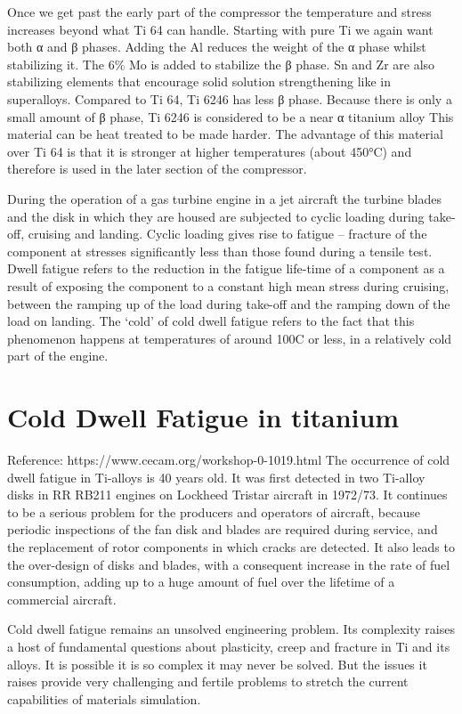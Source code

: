 Once we get past the early part of the compressor the temperature and stress increases beyond what Ti 64 can handle.  Starting with pure Ti we again want both α and β phases.  Adding the Al reduces the weight of the α phase whilst stabilizing it.  The 6\% Mo is added to stabilize the β phase.  Sn and Zr are also stabilizing elements that encourage solid solution strengthening like in superalloys.  Compared to Ti 64, Ti 6246 has less β phase.  Because there is only a small amount of β phase, Ti 6246 is considered to be a near α titanium alloy  This material can be heat treated to be made harder.  The advantage of this material over Ti 64 is that it is stronger at higher temperatures (about 450°C) and therefore is used in the later section of the compressor.

During the operation of a gas turbine engine in a jet aircraft the turbine blades and the disk in which they are housed are subjected to cyclic loading during take-off, cruising and landing. Cyclic loading gives rise to fatigue – fracture of the component at stresses significantly less than those found during a tensile test. Dwell fatigue refers to the reduction in the fatigue life-time of a component as a result of exposing the component to a constant high mean stress during cruising, between the ramping up of the load during take-off and the ramping down of the load on landing. The ‘cold’ of cold dwell fatigue refers to the fact that this phenomenon happens at temperatures of around 100C or less, in a relatively cold part of the engine.



\section{Cold Dwell Fatigue in titanium} 
Reference: https://www.cecam.org/workshop-0-1019.html
The occurrence of cold dwell fatigue in Ti-alloys is 40 years old. It was first detected in two Ti-alloy disks in RR RB211 engines on Lockheed Tristar aircraft in 1972/73. It continues to be a serious problem for the producers and operators of aircraft, because periodic inspections of the fan disk and blades are required during service, and the replacement of rotor components in which cracks are detected. It also leads to the over-design of disks and blades, with a consequent increase in the rate of fuel consumption, adding up to a huge amount of fuel over the lifetime of a commercial aircraft.

Cold dwell fatigue remains an unsolved engineering problem. Its complexity raises a host of fundamental questions about plasticity, creep and fracture in Ti and its alloys. It is possible it is so complex it may never be solved. But the issues it raises provide very challenging and fertile problems to stretch the current capabilities of materials simulation.

